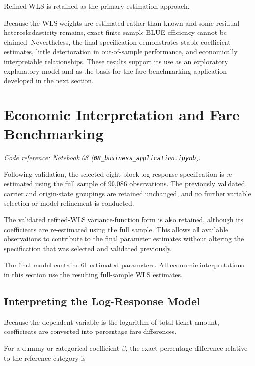 \documentclass[11pt,a4paper]{article}
\begin{document}
Refined WLS is retained as the primary estimation approach.

Because the WLS weights are estimated rather than known and some residual heteroskedasticity remains, exact finite-sample BLUE efficiency cannot be claimed. Nevertheless, the final specification demonstrates stable coefficient estimates, little deterioration in out-of-sample performance, and economically interpretable relationships. These results support its use as an exploratory explanatory model and as the basis for the fare-benchmarking application developed in the next section.


\section{Economic Interpretation and Fare Benchmarking}

\noindent\textit{Code reference: Notebook 08 (\texttt{08\_business\_application.ipynb}).}

Following validation, the selected eight-block log-response specification is re-estimated using the full sample of 90,086 observations. The previously validated carrier and origin-state groupings are retained unchanged, and no further variable selection or model refinement is conducted.

The validated refined-WLS variance-function form is also retained, although its coefficients are re-estimated using the full sample. This allows all available observations to contribute to the final parameter estimates without altering the specification that was selected and validated previously.

The final model contains 61 estimated parameters. All economic interpretations in this section use the resulting full-sample WLS estimates.

\subsection{Interpreting the Log-Response Model}

Because the dependent variable is the logarithm of total ticket amount, coefficients are converted into percentage fare differences.

For a dummy or categorical coefficient \(\beta\), the exact percentage difference relative to the reference category is
\end{document}
